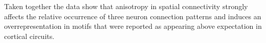 Taken together the data show that anisotropy in spatial connectivity
strongly affects the relative occurrence of three neuron connection
patterns and induces an overrepresentation in motifs that were
reported as appearing above expectation in cortical circuits.






%

